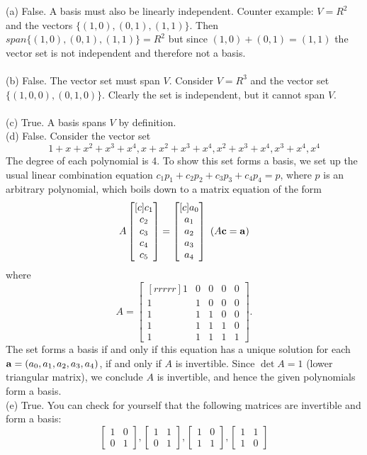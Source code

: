\begin{solution}
\noindent (a) False. A basis must also be linearly independent. Counter example: $V = R^2$ and the vectors $\{(1,0),(0,1),(1,1)\}$. Then $span\{(1,0),(0,1),(1,1)\} = R^2$ but since $(1,0) + (0,1) = (1,1)$ the vector set is not independent and therefore not a basis.
\\
\\ 
(b) False. The vector set must span $V$. Consider $V = R^3$ and the vector set $\{(1,0,0),(0,1,0)\}$. Clearly the set is independent, but it cannot span $V$.
\\ \\ 
(c) True. A basis spans $V$ by definition. 
\\
(d) False. Consider the vector set
$$
1+x+x^2+x^3+x^4, x+x^2+x^3+x^4, x^2+x^3+x^4, x^3+x^4, x^4
$$
The degree of each polynomial is 4. To show this set forms a basis, we set up the usual linear combination equation $c_1p_1+c_2p_2+c_3p_3+c_4p_4=p$, where $p$ is an arbitrary polynomial, which boils down to a matrix equation of the form 
\[
A\begin{bmatrix}[c] c_1\\ c_2\\ c_3\\ c_4\\c_5 \end{bmatrix}=\begin{bmatrix}[c] a_0\\ a_1\\ a_2\\ a_3\\a_4 \end{bmatrix} \text{ ($A{\mathbf c}={\mathbf a}$)}
\]
where 
$$
A = 
\begin{bmatrix}[rrrrr]
1&0&0&0&0\\
1&1&0&0&0\\
1&1&1&0&0\\
1&1&1&1&0\\
1&1&1&1&1
\end{bmatrix}.
$$
The set forms a basis if and only if this equation has a unique solution for each ${\mathbf a}=(a_0,a_1,a_2,a_3,a_4)$, if and only if $A$ is invertible. Since $\det A=1$ (lower triangular matrix), we conclude $A$ is invertible, and hence the given polynomials form a basis. 
\\
(e) True. You can check for yourself that the following matrices are invertible and form a basis:
\[
\begin{bmatrix}
1&0\\
0&1
\end{bmatrix}, 
\begin{bmatrix}
1&1\\
0&1
\end{bmatrix},
\begin{bmatrix}
1&0\\
1&1
\end{bmatrix},
\begin{bmatrix}
1&1\\
1&0
\end{bmatrix}
\]
\end{solution}

\ee
